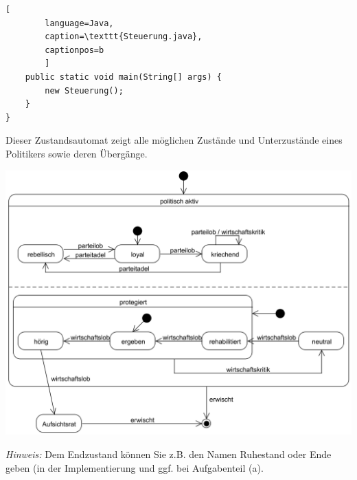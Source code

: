 \documentclass{abgabe}
\begin{document}
\begin{questions}
\begin{lstlisting}[
        language=Java, 
        caption=\texttt{Steuerung.java}, 
        captionpos=b
        ]
    public static void main(String[] args) {
        new Steuerung();
    }
}
    \end{lstlisting}


    Dieser Zustandsautomat zeigt alle möglichen Zustände und Unterzustände eines Politikers sowie deren Übergänge.

    \begin{center}
        \includegraphics[width=.7\textwidth]{politiker_zustandsautomat.png}
    \end{center}

    \emph{Hinweis:} Dem Endzustand können Sie z.B. den Namen Ruhestand oder Ende geben (in der Implementierung und ggf. bei Aufgabenteil (a).

\end{questions}
\end{document}

